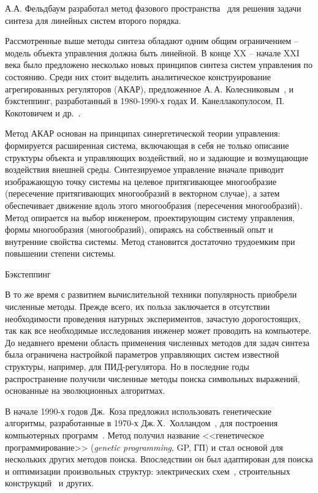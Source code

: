 

А.А. Фельдбаум разработал метод фазового пространства~\cite{Фельдбаум1953, Фельдбаум1955} для решения задачи синтеза для линейных систем второго порядка.

Рассмотренные выше методы синтеза обладают одним общим ограничением -- модель объекта управления должна быть линейной. 
В конце XX -- начале XXI века было предложено несколько новых принципов синтеза систем управления по состоянию.
Среди них стоит выделить аналитическое конструирование агрегированных регуляторов (АКАР), предложенное А.\,А. Колесниковым~\cite{Колесников2006, Колесников1994}, и бэкстеппинг, разработанный в 1980-1990-х годах И. Канеллакопулосом, П. Кокотовичем и др.~\cite{Kanellakopoulos1989, Kanellakopoulos1991, Krstic1995}.

Метод АКАР основан на принципах синергетической теории управления: формируется расширенная система, включающая в себя не только описание структуры объекта и управляющих воздействий, но и задающие и возмущающие воздействия внешней среды.
Синтезируемое управление вначале приводит изображающую точку системы на целевое притягивающее многообразие (пересечение притягивающих многообразий в векторном случае), а затем обеспечивает движение вдоль этого многообразия (пересечения многообразий). 
Метод опирается на выбор инженером, проектирующим систему управления, формы многообразия (многообразий), опираясь на собственный опыт и внутренние свойства системы. Метод становится достаточно трудоемким при повышении степени системы.

Бэкстеппинг 

В то же время с развитием вычислительной техники популярность приобрели численные методы.
Прежде всего, их польза заключается в отсутствии необходимости проведения натурных экспериментов, зачастую дорогостоящих, так как все необходимые исследования инженер может проводить на компьютере.
До недавнего времени область применения численных методов для задач синтеза была ограничена настройкой параметров управляющих систем известной структуры, например, для ПИД-регулятора.
Но в последние годы распространение получили численные методы поиска символьных выражений, основанные на эволюционных алгоритмах.

В начале 1990-х годов Дж.~Коза предложил использовать генетические алгоритмы, разработанные в 1970-х Дж.\,Х.~Холландом~\cite{Holland1973, Holland1975}, для построения компьютерных программ~\cite{Koza1990, Koza1990a, Koza1992a}.
Метод получил название <<генетическое программирование>> (\textit{genetic programming}, GP, ГП) и стал основой для нескольких других методов поиска.
Впоследствии он был адаптирован для поиска и оптимизации произвольных структур: электрических схем~, строительных конструкций~ и других.

